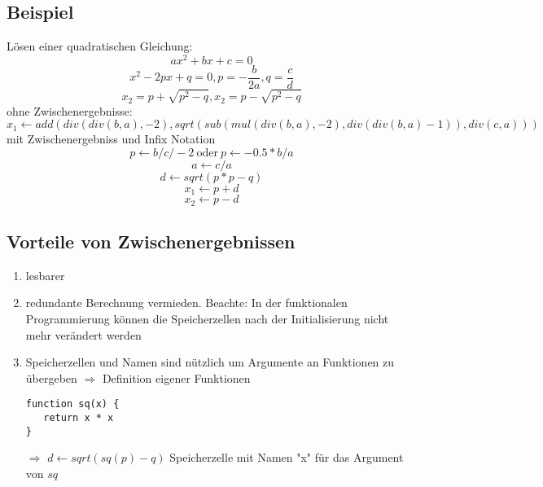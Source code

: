 \documentclass[a4paper]{scrartcl}
\begin{document}
\subsection{Beispiel}
\label{sec-8-1}
Lösen einer quadratischen Gleichung:
\[ax^2 + bx + c = 0\]
\[x^2 - 2px + q = 0, p = -\frac{b}{2a},q=\frac{c}{d}\]
\[x_2 = p + \sqrt{p^2 - q},x_2 = p - \sqrt{p^2 - q}\]
ohne Zwischenergebnisse:
\[x_1 \leftarrow add(div(div(b,a),-2),sqrt(sub(mul(div(b,a),-2),div(div(b,a)-1)),div(c,a)))\]
mit Zwischenergebniss und Infix Notation
\[p\leftarrow b / c / -2~\text{oder}~p\leftarrow -0.5 * b / a\]
\[a\leftarrow c / a\]
\[d\leftarrow sqrt(p*p - q)\]
\[x_1\leftarrow p + d\]
\[x_2\leftarrow p - d\]
\subsection{Vorteile von Zwischenergebnissen}
\label{sec-8-2}
\begin{enumerate}
\item lesbarer
\item redundante Berechnung vermieden. Beachte: In der funktionalen Programmierung können die Speicherzellen nach der Initialisierung nicht mehr verändert werden
\item Speicherzellen und Namen sind nützlich um Argumente an Funktionen zu übergeben $\Rightarrow$ Definition eigener Funktionen
\begin{verbatim}
function sq(x) {
   return x * x
}
\end{verbatim}
$\Rightarrow$ $d \leftarrow sqrt(sq(p) - q)$
Speicherzelle mit Namen "x" für das Argument von $sq$
\end{enumerate}
\end{document}
